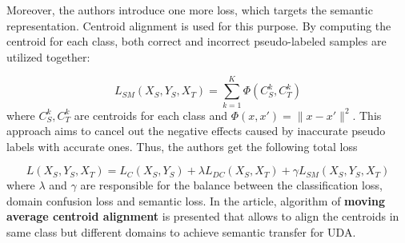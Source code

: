Moreover, the authors introduce one more loss, which targets the semantic representation. Centroid alignment is used for this purpose. By computing the centroid for each class, both correct and incorrect pseudo-labeled samples are utilized together: 

\begin{equation}
L_{SM}(X_S, Y_S, X_T) = \sum_{k=1}^K \Phi(C_S^k, C_T^k)
\end{equation}
where $C_S^k, C_T^k$ are centroids for each class and $\Phi(x, x') = \| x - x' \|^2$. This approach aims to cancel out the negative effects caused by inaccurate pseudo labels with accurate ones. Thus, the authors get the following total loss

 \begin{equation}
 L(X_S, Y_S, X_T) = L_C(X_S, Y_S) + \lambda L_{DC}(X_S, X_T) + \gamma L_{SM}(X_S, Y_S, X_T)
 \end{equation}
 where $\lambda$ and $\gamma$ are responsible for the balance between the classification
loss, domain confusion loss and semantic loss. In the article, algorithm of \textbf{moving average centroid alignment} is presented that allows to align the centroids in same class
but different domains to achieve semantic transfer for UDA.